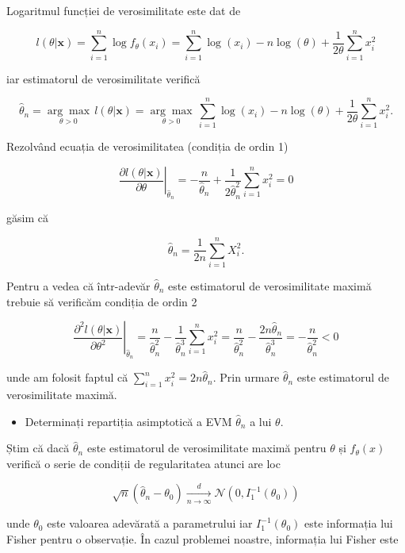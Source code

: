 \documentclass[]{article}
\newenvironment{frshaded*}{%
  \def\FrameCommand{\fboxrule=\FrameRule\fboxsep=\FrameSep \fcolorbox{framecolor}{shadecolor1}}%
  \MakeFramed {\advance\hsize-\width \FrameRestore}}%
{\endMakeFramed}
\newenvironment{rmdblock}[1]
  {\begin{frshaded*}
  \begin{itemize}
  \renewcommand{\labelitemi}{
    \raisebox{-.7\height}[0pt][0pt]{
      {\setkeys{Gin}{width=2em,keepaspectratio}\texttt{[image: images/icons/\#1]}}
    }
  }
  \item
  }
  {
  \end{itemize}
  \end{frshaded*}
  }
\newenvironment{rmdexercise}
  {\begin{rmdblock}{exercise}}
  {\end{rmdblock}}
\begin{document}
Logaritmul funcției de verosimilitate este dat de

\[
  l(\theta|\mathbf{x}) = \sum_{i=1}^{n}\log{f_{\theta}(x_i)} = \sum_{i = 1}^{n}\log(x_i) - n\log(\theta) + \frac{1}{2\theta}\sum_{i = 1}^{n}x_i^2
\]

iar estimatorul de verosimilitate verifică

\[
  \hat{\theta}_n = \underset{\theta>0}{\arg\max}\, l(\theta|\mathbf{x}) = \underset{\theta>0}{\arg\max}\, \sum_{i = 1}^{n}\log(x_i) - n\log(\theta) + \frac{1}{2\theta}\sum_{i = 1}^{n}x_i^2.
\]

Rezolvând ecuația de verosimilitatea (condiția de ordin 1)

\[
  \left. \frac{\partial l(\theta|\mathbf{x})}{\partial\theta}\right\vert_{\hat{\theta}_n} = -\frac{n}{\hat{\theta}_n} + \frac{1}{2\hat{\theta}_n^2}\sum_{i = 1}^{n}x_i^2 = 0
\]

găsim că

\[
  \hat{\theta}_n = \frac{1}{2n}\sum_{i = 1}^{n} X_i^2.
\]

Pentru a vedea că într-adevăr \(\hat{\theta}_n\) este estimatorul de
verosimilitate maximă trebuie să verificăm condiția de ordin 2

\[
  \left. \frac{\partial^2 l(\theta|\mathbf{x})}{\partial\theta^2}\right\vert_{\hat{\theta}_n} = \frac{n}{\hat{\theta}_n^2} - \frac{1}{\hat{\theta}_n^3}\sum_{i = 1}^{n}x_i^2 = \frac{n}{\hat{\theta}_n^2} - \frac{2n\hat{\theta}_n}{\hat{\theta}_n^3} = - \frac{n}{\hat{\theta}_n^2}<0 
\]

unde am folosit faptul că \(\sum_{i = 1}^{n}x_i^2 = 2n\hat{\theta}_n\).
Prin urmare \(\hat{\theta}_n\) este estimatorul de verosimilitate
maximă.

\begin{rmdexercise}
Determinați repartiția asimptotică a EVM \(\hat{\theta}_n\) a lui
\(\theta\).
\end{rmdexercise}

Știm că dacă \(\hat{\theta}_n\) este estimatorul de verosimilitate
maximă pentru \(\theta\) și \(f_{\theta}(x)\) verifică o serie de
condiții de regularitatea atunci are loc

\[
  \sqrt{n}\left(\hat{\theta}_n - \theta_0\right) \underset{n\to\infty}{\overset{d}{\longrightarrow}} \mathcal{N}(0,I_1^{-1}(\theta_0))
\]

unde \(\theta_0\) este valoarea adevărată a parametrului iar
\(I_1^{-1}(\theta_0)\) este informația lui Fisher pentru o observație.
În cazul problemei noastre, informația lui Fisher este
\end{document}
